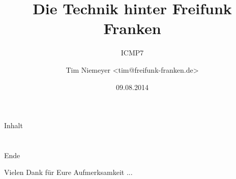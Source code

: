 \documentclass[12pt,hyperref={pdfpagelabels=false},notes=show]{beamer}
\title{Die Technik hinter Freifunk Franken}
\subtitle[ICMP7 Hackercamp]{ICMP7}
\author[Tim Niemeyer]{Tim Niemeyer {\tiny \textless{}tim@freifunk-franken.de\textgreater{}}}
\date[9.8.2014]{09.08.2014}
\begin{document}

\beamertemplatenavigationsymbolsempty
\begin{frame}
	\maketitle
\end{frame}\addtocounter{framenumber}{-1}


\begin{frame}{Inhalt}
    \hspace{0.1\textwidth}
    \parbox[c][0.8\textheight][s]{0.8\textwidth}{
        \tableofcontents
    }
\end{frame}










\section*{}
\begin{frame}{Ende}
    \begin{center}
        Vielen Dank für Eure Aufmerksamkeit	...
     \end{center}
\end{frame}\addtocounter{framenumber}{-1}
	
\section*{}


\end{document}
